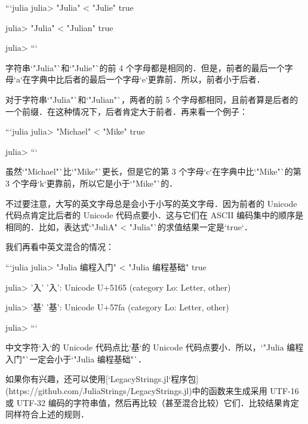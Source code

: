 ```julia
julia> "Julia" < "Julie"
true

julia> "Julia" < "Julian" 
true

julia> 
```

字符串`"Julia"`和`"Julie"`的前 4 个字母都是相同的．但是，前者的最后一个字母`a`在字典中比后者的最后一个字母`e`更靠前．所以，前者小于后者．

对于字符串`"Julia"`和`"Julian"`，两者的前 5 个字母都相同，且前者算是后者的一个前缀．在这种情况下，后者肯定大于前者．再来看一个例子：

```julia
julia> "Michael" < "Mike"
true

julia> 
```

虽然`"Michael"`比`"Mike"`更长，但是它的第 3 个字母`c`在字典中比`"Mike"`的第 3 个字母`k`更靠前，所以它是小于`"Mike"`的．

不过要注意，大写的英文字母总是会小于小写的英文字母．因为前者的 Unicode 代码点肯定比后者的 Unicode 代码点要小．这与它们在 ASCII 编码集中的顺序是相同的．比如，表达式`"JuliA" < "Julia"`的求值结果一定是`true`．

我们再看中英文混合的情况：

```julia
julia> "Julia 编程入门" < "Julia 编程基础"
true

julia> '入'
'入': Unicode U+5165 (category Lo: Letter, other)

julia> '基'
'基': Unicode U+57fa (category Lo: Letter, other)

julia> 
```

中文字符`入`的 Unicode 代码点比`基`的 Unicode 代码点要小．所以，`"Julia 编程入门"`一定会小于`"Julia 编程基础"`．

如果你有兴趣，还可以使用[`LegacyStrings.jl`程序包](https://github.com/JuliaStrings/LegacyStrings.jl)中的函数来生成采用 UTF-16 或 UTF-32 编码的字符串值，然后再比较（甚至混合比较）它们．比较结果肯定同样符合上述的规则．
